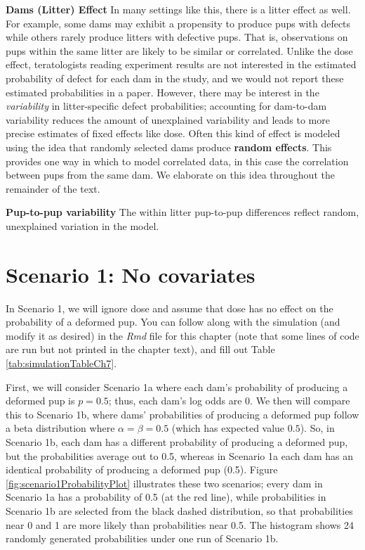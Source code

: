 \documentclass[
]{krantz}
\begin{document}
\textbf{Dams (Litter) Effect} In many settings like this, there is a litter effect as well. For example, some dams may exhibit a propensity to produce pups with defects while others rarely produce litters with defective pups. That is, observations on pups within the same litter are likely to be similar or correlated. Unlike the dose effect, teratologists reading experiment results are not interested in the estimated probability of defect for each dam in the study, and we would not report these estimated probabilities in a paper. However, there may be interest in the \emph{variability} in litter-specific defect probabilities; accounting for dam-to-dam variability reduces the amount of unexplained variability and leads to more precise estimates of fixed effects like dose. Often this kind of effect is modeled using the idea that randomly selected dams produce \textbf{random effects}.  This provides one way in which to model correlated data, in this case the correlation between pups from the same dam. We elaborate on this idea throughout the remainder of the text.

\textbf{Pup-to-pup variability} The within litter pup-to-pup differences reflect random, unexplained variation in the model.

\hypertarget{scenario-1-no-covariates}{%
\section{Scenario 1: No covariates}\label{scenario-1-no-covariates}}

In Scenario 1, we will ignore dose and assume that dose has no effect on the probability of a deformed pup. You can follow along with the simulation (and modify it as desired) in the \emph{Rmd} file for this chapter (note that some lines of code are run but not printed in the chapter text), and fill out Table \ref{tab:simulationTableCh7}.

First, we will consider Scenario 1a where each dam's probability of producing a deformed pup is \(p = 0.5\); thus, each dam's log odds are 0. We then will compare this to Scenario 1b, where dams' probabilities of producing a deformed pup follow a beta distribution where \(\alpha = \beta = 0.5\) (which has expected value \(0.5\)). So, in Scenario 1b, each dam has a different probability of producing a deformed pup, but the probabilities average out to 0.5, whereas in Scenario 1a each dam has an identical probability of producing a deformed pup (0.5). Figure \ref{fig:scenario1ProbabilityPlot} illustrates these two scenarios; every dam in Scenario 1a has a probability of 0.5 (at the red line), while probabilities in Scenario 1b are selected from the black dashed distribution, so that probabilities near 0 and 1 are more likely than probabilities near 0.5. The histogram shows 24 randomly generated probabilities under one run of Scenario 1b.
\end{document}
